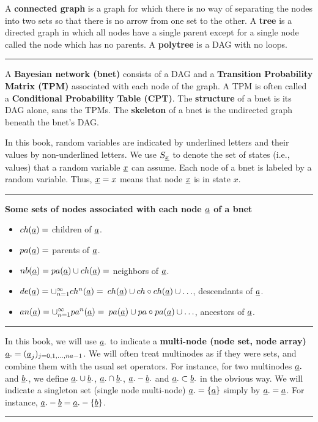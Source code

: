 A {\bf connected graph}
is a graph for which there
is no way of separating
the nodes into
two sets so that there is no arrow
from one set to the other.
A {\bf tree}
is a directed graph
in which all nodes
have a single parent
except for a single
node called the  node
which has no parents.
A {\bf polytree}
is a DAG with
no loops.





\hrule

A {\bf Bayesian network (bnet)}
consists of a DAG
and a
{\bf Transition
Probability Matrix (TPM)}
associated
with each node
of the graph.
A TPM is often
called a {\bf Conditional Probability
Table
(CPT)}.
The {\bf structure} of a bnet
is its DAG alone, sans the TPMs.
The
{\bf skeleton} of a bnet is the
undirected graph beneath the bnet's
DAG.



In
this book,
random  variables are
 indicated by
underlined letters and their values
by non-underlined letters.
We use $S_\rvx$
to denote the set of states (i.e., values)
that a random variable $\rvx$ can assume.
 Each node of a bnet is
 labeled by a random variable.
 Thus, $\rvx=x$ means that node
$\rvx$ is in state $x$.

\hrule\noindent
{\bf Some sets of nodes
associated
with each node $\rva$
of a bnet}
\begin{itemize}
\item
$ch(\rva)=$ children of $\rva$.
\item
$pa(\rva)=$ parents of $\rva$.
\item
$nb(\rva)=pa(\rva)\cup ch(\rva)=$
neighbors of $\rva$.
\item
$de(\rva)=\cup_{n=1}^{\infty}ch^n(\rva)=$
$ch(\rva)\cup ch\circ ch(\rva)\cup\ldots$,
descendants of $\rva$.
\item
$an(\rva)=\cup_{n=1}^{\infty}pa^n(\rva)=$
$pa(\rva)\cup pa\circ pa(\rva)\cup\ldots$,
ancestors of $\rva$.
\end{itemize}
\hrule
In this book,
we will use
$\rva.$
to indicate
a {\bf multi-node (node set,
node array)} $\rva.=
(\rva_j)_{j=0, 1, \ldots , na-1}$.
We will often
treat multinodes as if
they were sets, and
combine them with
the usual
set
operators.
For instance,
for two
multinodes $\rva.$
and $\rvb.$,
we define
$\rva.\cup\rvb.$,
$\rva.\cap\rvb.$,
$\rva.-\rvb.$
and
$\rva.\subset\rvb.$
in the obvious way.
We
will indicate
a singleton set (single
node multi-node) $\rva.=\{\rva\}$
simply by $\rva.=\rva$.
For instance,
$\rva.-\rvb=\rva.-\{\rvb\}$.
\hrule

